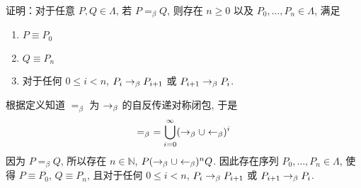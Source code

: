 \begin{problem}
证明：对于任意 $P, Q \in \Lambda$, 若 $P =_\beta Q$, 则存在 $n \ge 0$ 以及 $P_0, \dots, P_n \in \Lambda$, 满足
\begin{enumerate}
\item $P \equiv P_0$
\item $Q \equiv P_n$
\item 对于任何 $0 \le i < n$, $P_i \rightarrow_\beta P_{i+1}$ 或 $P_{i+1} \rightarrow_\beta P_{i}$.
\end{enumerate}
\end{problem}

\begin{solution}
根据定义知道 $=_\beta$ 为 $\rightarrow_\beta$ 的自反传递对称闭包, 于是
\[
=_\beta ~ = \bigcup_{i=0}^\infty (\rightarrow_\beta \cup \leftarrow_\beta)^i
\]
因为 $P =_\beta Q$, 所以存在 $n \in \mathbb{N}$, $P (\rightarrow_\beta \cup \leftarrow_\beta)^n Q$. 因此存在序列 $P_0, \dots, P_n \in \Lambda$, 使得 $P \equiv P_0$, $Q \equiv P_n$, 且对于任何 $0 \le i < n$, $P_i \rightarrow_\beta P_{i+1}$ 或 $P_{i+1} \rightarrow_\beta P_{i}$.
\end{solution}